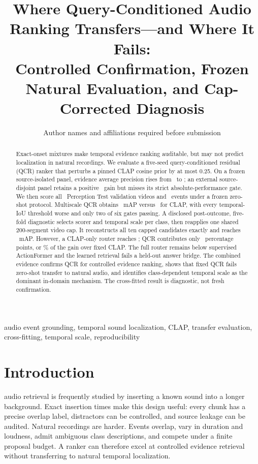\documentclass[journal,10pt]{IEEEtran}
\title{Where Query-Conditioned Audio Ranking Transfers---and Where It Fails:\\
Controlled Confirmation, Frozen Natural Evaluation, and Cap-Corrected Diagnosis}
\author{Author names and affiliations required before submission}
\begin{document}
\maketitle

\begin{abstract}
Exact-onset mixtures make temporal evidence ranking auditable, but may not
predict localization in natural recordings. We evaluate a five-seed
query-conditioned residual (QCR) ranker that perturbs a pinned CLAP cosine
prior by at most 0.25. On a frozen source-isolated panel, evidence average
precision rises from \ControlledPriorAP\ to \ControlledQCRAP; an external
source-disjoint panel retains a positive \ExternalAPDelta\ gain but misses its
strict absolute-performance gate. We then score all \NaturalVideos\
Perception Test validation videos and \NaturalEvents\ events under a frozen
zero-shot protocol. Multiscale QCR obtains \NaturalQCRMAP\ mAP versus
\NaturalCLAPMAP\ for CLAP, with every temporal-IoU threshold worse and only
two of six gates passing. A disclosed post-outcome, five-fold diagnostic
selects scorer and temporal scale per class, then reapplies one shared
200-segment video cap. It reconstructs all ten capped candidates exactly and
reaches \RouterMAP\ mAP. However, a CLAP-only router reaches
\CLAPRouterMAP; QCR contributes only \IncrementalMAPPoints\ percentage points,
or \IncrementalGainShare\% of the gain over fixed CLAP. The full router remains
below supervised ActionFormer and the learned retrieval fails a held-out
answer bridge. The combined evidence confirms QCR for controlled evidence
ranking, shows that fixed QCR fails zero-shot transfer to natural audio, and identifies
class-dependent temporal scale as the dominant in-domain mechanism. The
cross-fitted result is diagnostic, not fresh confirmation.
\end{abstract}

\begin{IEEEkeywords}
audio event grounding, temporal sound localization, CLAP, transfer
evaluation, cross-fitting, temporal scale, reproducibility
\end{IEEEkeywords}

\section{Introduction}
 audio retrieval is frequently studied by
inserting a known sound into a longer background. Exact insertion times make
this design useful: every chunk has a precise overlap label, distractors can
be controlled, and source leakage can be audited. Natural recordings are
harder. Events overlap, vary in duration and loudness, admit ambiguous class
descriptions, and compete under a finite proposal budget. A ranker can
therefore excel at controlled evidence retrieval without transferring to
natural temporal localization.
\end{document}
